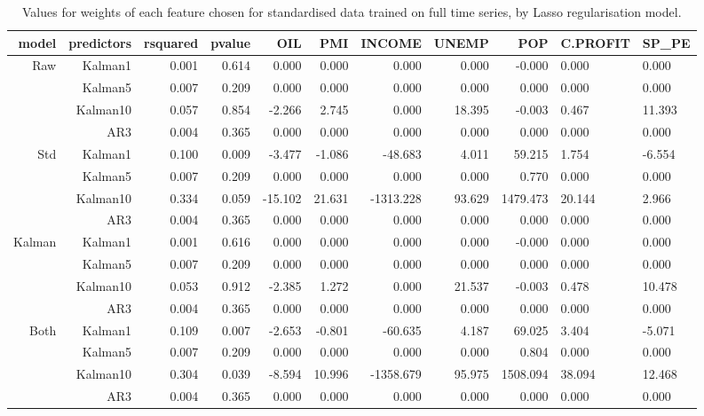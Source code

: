 \documentclass{sig-alternate-05-2015}
\begin{document}
\begin{table}[t]
\centering
\begin{tabular}{rrrr|rrrrrll}
  \hline
model & predictors & rsquared & pvalue & OIL & PMI & INCOME & UNEMP & POP& C.PROFIT & SP\_PE \\ 
  \hline
\multirow{4}{*}{Raw} & Kalman1 & 0.001 & 0.614 & 0.000 & 0.000 & 0.000 & 0.000 & -0.000 & 0.000 & 0.000  \\ 
& Kalman5 & 0.007 & 0.209 & 0.000 & 0.000 & 0.000 & 0.000 & 0.000 & 0.000 & 0.000 \\ 
& Kalman10 & 0.057 & 0.854 & -2.266 & 2.745 & 0.000 & 18.395 & -0.003 & 0.467 & 11.393  \\ 
& AR3 & 0.004 & 0.365 & 0.000 & 0.000 & 0.000 & 0.000 & 0.000 & 0.000 & 0.000  \\ 
\hline
\multirow{4}{*}{Std} & Kalman1 & 0.100 & 0.009 & -3.477 & -1.086 & -48.683 & 4.011 & 59.215 & 1.754 & -6.554 \\ 
& Kalman5 & 0.007 & 0.209 & 0.000 & 0.000 & 0.000 & 0.000 & 0.770 & 0.000 & 0.000  \\ 
& Kalman10 & 0.334 & 0.059 & -15.102 & 21.631 & -1313.228 & 93.629 & 1479.473 & 20.144 & 2.966  \\ 
& AR3 & 0.004 & 0.365 & 0.000 & 0.000 & 0.000 & 0.000 & 0.000 & 0.000 & 0.000  \\ 
\hline
\multirow{4}{*}{Kalman} & Kalman1 & 0.001 & 0.616 & 0.000 & 0.000 & 0.000 & 0.000 & -0.000 & 0.000 & 0.000  \\ 
& Kalman5 & 0.007 & 0.209 & 0.000 & 0.000 & 0.000 & 0.000 & 0.000 & 0.000 & 0.000  \\ 
& Kalman10 & 0.053 & 0.912 & -2.385 & 1.272 & 0.000 & 21.537 & -0.003 & 0.478 & 10.478  \\ 
& AR3 & 0.004 & 0.365 & 0.000 & 0.000 & 0.000 & 0.000 & 0.000 & 0.000 & 0.000   \\ 
\hline
\multirow{4}{*}{Both} & Kalman1 & 0.109 & 0.007 & -2.653 & -0.801 & -60.635 & 4.187 & 69.025 & 3.404 & -5.071  \\ 
& Kalman5 & 0.007 & 0.209 & 0.000 & 0.000 & 0.000 & 0.000 & 0.804 & 0.000 & 0.000 \\ 
& Kalman10 & 0.304 & 0.039 & -8.594 & 10.996 & -1358.679 & 95.975 & 1508.094 & 38.094 & 12.468 \\ 
& AR3 & 0.004 & 0.365 & 0.000 & 0.000 & 0.000 & 0.000 & 0.000 & 0.000 & 0.000   \\ 
   \hline
\end{tabular}
\caption[caption blah]{ Values for weights of each feature chosen for standardised data trained on full time series, by Lasso regularisation model. \footnotemark}
\end{table}




 
\end{document}

